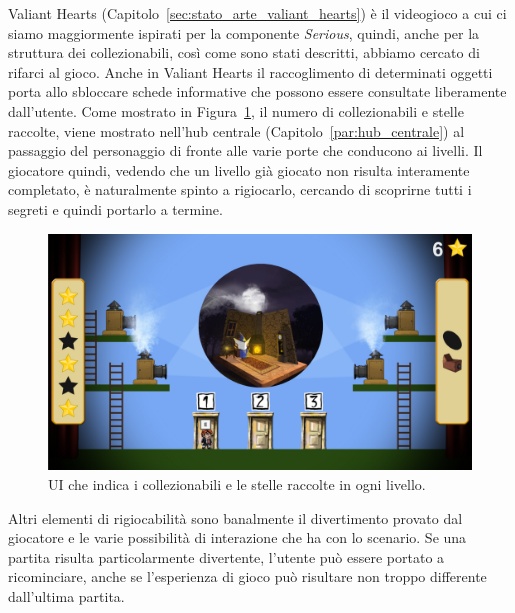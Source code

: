 Valiant Hearts (Capitolo~\ref{sec:stato_arte_valiant_hearts}) è il videogioco a cui ci siamo maggiormente ispirati per la componente \textit{Serious}, quindi, anche per la struttura dei collezionabili, così come sono stati descritti, abbiamo cercato di rifarci al gioco. Anche in Valiant Hearts il raccoglimento di determinati oggetti porta allo sbloccare schede informative che possono essere consultate liberamente dall’utente.
Come mostrato in Figura~\ref{fig:rigiocabilita_UI_hub}, il numero di collezionabili e stelle raccolte, viene mostrato nell’hub centrale (Capitolo~\ref{par:hub_centrale}) al passaggio del personaggio di fronte alle varie porte che conducono ai livelli. Il giocatore quindi, vedendo che un livello già giocato non risulta interamente completato, è naturalmente spinto a rigiocarlo, cercando di scoprirne tutti i segreti e quindi portarlo a termine.

\begin{figure}%
	\centering
	\includegraphics[width= 0.9\columnwidth]{images/gameDesign/26_hub.jpg}
	\caption{UI che indica i collezionabili e le stelle raccolte in ogni livello.}
	\label{fig:rigiocabilita_UI_hub}
\end{figure} 

Altri elementi di rigiocabilità sono banalmente il divertimento provato dal giocatore e le varie possibilità di interazione che ha con lo scenario.
Se una partita risulta particolarmente divertente, l’utente può essere portato a ricominciare, anche se l’esperienza di gioco può risultare non troppo differente dall’ultima partita.

